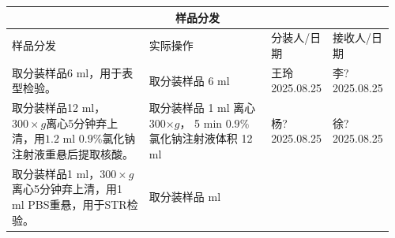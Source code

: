 \documentclass[UTF8,10pt,a4paper,fontset=fandol]{ctexart}
\newcommand{\fieldvalue}[1]{#1}
\newcommand{\handwritten}[1]{#1}
\begin{document}
\vspace{2mm}

\noindent
\begin{tabular}{|p{0.36\linewidth}|p{0.32\linewidth}|p{0.14\linewidth}|p{0.14\linewidth}|}
\hline
\multicolumn{4}{|c|}{样品分发}\\ \hline
样品分发 & 实际操作 & 分装人/日期 & 接收人/日期\\ \hline
取分装样品6 ml，用于表型检验。&
取分装样品
\fieldvalue{\handwritten{6}} ml
&
\fieldvalue{\handwritten{王玲}}\newline
\fieldvalue{\handwritten{2025.08.25}}
&
\fieldvalue{\handwritten{李?}}\newline
\fieldvalue{\handwritten{2025.08.25}}
\\ \hline
取分装样品12 ml，$300\times g$离心5分钟弃上清，用$1.2$ ml $0.9\%$氯化钠注射液重悬后提取核酸。&
取分装样品
\fieldvalue{\handwritten{1}} ml\newline
离心
\fieldvalue{\handwritten{300}}$\times g$，
\fieldvalue{\handwritten{5}} min\newline
$0.9\%$氯化钠注射液体积
\fieldvalue{\handwritten{12}} ml
&
\fieldvalue{\handwritten{杨?}}\newline
\fieldvalue{\handwritten{2025.08.25}}
&
\fieldvalue{\handwritten{徐?}}\newline
\fieldvalue{\handwritten{2025.08.25}}
\\ \hline
取分装样品1 ml，$300\times g$离心5分钟弃上清，用1 ml PBS重悬，用于STR检验。&
取分装样品 \underline{\hspace{1cm}} ml\newline

\end{tabular}
\end{document}
